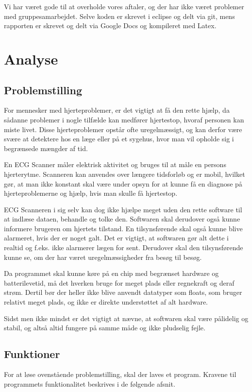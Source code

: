 \documentclass{article}
\begin{document}
Vi har været gode til at overholde vores aftaler, og der har ikke været problemer med gruppesamarbejdet. Selve koden er skrevet i eclipse og delt via git, mens rapporten er skrevet og delt via Google Docs og kompileret med Latex.

\section{Analyse}
\subsection{Problemstilling}
For mennesker med hjerteproblemer, er det vigtigt at få den rette hjælp, da sådanne problemer i nogle tilfælde kan medfører hjertestop, hvoraf personen kan miste livet. Disse hjerteproblemer opstår ofte uregelmæssigt, og kan derfor være svære at detektere hos en læge eller på et sygehus, hvor man vil opholde sig i begrænsede mængder af tid.

En ECG Scanner måler elektrisk aktivitet og bruges til at måle en persons hjerterytme. Scanneren kan anvendes over længere tidsforløb og er mobil, hvilket gør, at man ikke konstant skal være under opsyn for at kunne få en diagnose på hjerteproblemerne og hjælp, hvis man skulle få hjertestop.

ECG Scanneren i sig selv kan dog ikke hjælpe meget uden den rette software til at indlæse dataen, behandle og tolke den. Softwaren skal derudover også kunne informere brugeren om hjertets tilstand. En tilsynsførende skal også kunne blive alarmeret, hvis der er noget galt. Det er vigtigt, at softwaren gør alt dette i realtid og f.eks. ikke alarmerer lægen for sent. Derudover skal den tilsynsførende kunne se, om der har været uregelmæssigheder fra besøg til besøg.

Da programmet skal kunne køre på en chip med begrænset hardware og batterilevetid, må det hverken bruge for meget plads eller regnekraft og deraf strøm. Dertil bør der heller ikke blive anvendt datatyper som floats, som bruger relativt meget plads, og ikke er direkte understøttet af alt hardware.

Sidst men ikke mindst er det vigtigt at nævne, at softwaren skal være pålidelig og stabil, og altså altid fungere på samme måde og ikke pludselig fejle.

\subsection{Funktioner}
For at løse ovenstående problemstilling, skal der laves et program. Kravene til programmets funktionalitet beskrives i de følgende afsnit.
\end{document}
